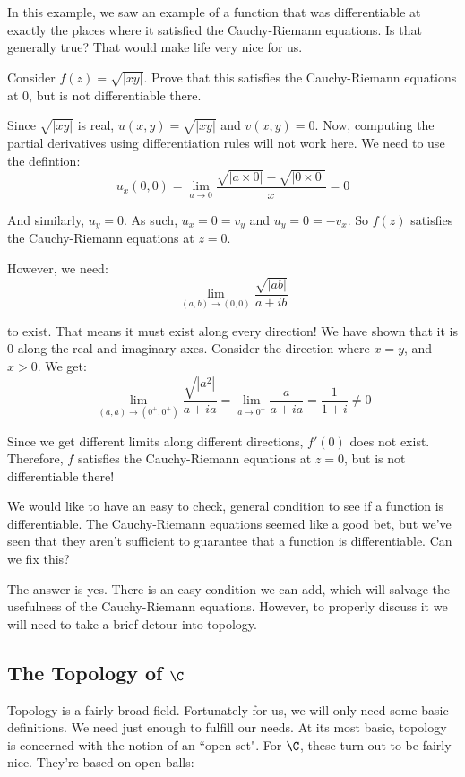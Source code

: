 In this example, we saw an example of a function that was differentiable at exactly the places where it satisfied the Cauchy-Riemann equations. Is that generally true? That would make life very nice for us.

\begin{ex}{}{}Consider $f(z) = \sqrt{|xy|}$. Prove that this satisfies the Cauchy-Riemann equations at $0$, but is not differentiable there.

Since $\sqrt{|xy|}$ is real, $u(x,y) = \sqrt{|xy|}$ and $v(x,y) = 0$. Now, computing the partial derivatives using differentiation rules will not work here. We need to use the defintion:
$$u_x(0,0) = \lim_{a\rightarrow 0} \frac{\sqrt{|a\times0|} - \sqrt{|0\times 0|}}{x} = 0$$

And similarly, $u_y = 0$. As such, $u_x = 0 = v_y$ and $u_y = 0 = -v_x$. So $f(z)$ satisfies the Cauchy-Riemann equations at $z = 0$.

However, we need:
$$\lim_{(a,b)\rightarrow (0,0)} \frac{\sqrt{|ab|}}{a + ib}$$

\noin to exist. That means it must exist along every direction! We have shown that it is $0$ along the real and imaginary axes. Consider the direction where $x = y$, and $x > 0$. We get:
$$\lim_{(a,a) \rightarrow (0^+,0^+)} \frac{\sqrt{|a^2|}}{a+ia} = \lim_{a\rightarrow 0^+}\frac{a}{a+ia} = \frac{1}{1+i} \ne 0$$ 

Since we get different limits along different directions, $f'(0)$ does not exist. Therefore, $f$ satisfies the Cauchy-Riemann equations at $z = 0$, but is not differentiable there!
\end{ex}

We would like to have an easy to check, general condition to see if a function is differentiable. The Cauchy-Riemann equations seemed like a good bet, but we've seen that they aren't sufficient to guarantee that a function is differentiable. Can we fix this?

The answer is yes. There is an easy condition we can add, which will salvage the usefulness of the Cauchy-Riemann equations. However, to properly discuss it we will need to take a brief detour into topology.

\subsection{The Topology of $\C$}

Topology is a fairly broad field. Fortunately for us, we will only need some basic definitions. We need just enough to fulfill our needs. At its most basic, topology is concerned with the notion of an ``open set". For $\C$, these turn out to be fairly nice. They're based on open balls:


